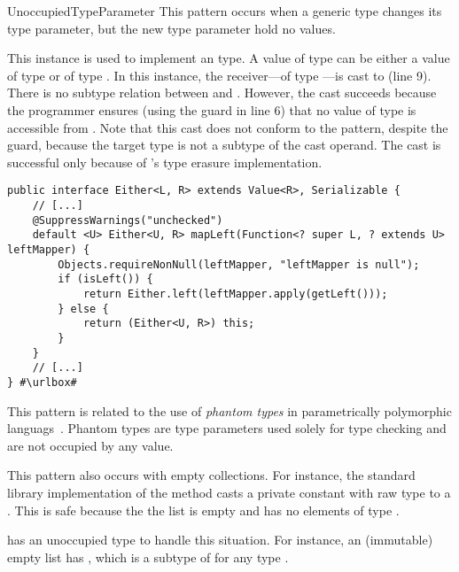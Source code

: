 \begin{pattern}{UnoccupiedTypeParameter}
This pattern occurs when a generic type changes its type parameter,
but the new type parameter hold no values.

\instances{}
This instance%
\def\urlvar{http://bit.ly/vavr_io_vavr_2SMIfI2}
is used to implement an  type.
A value of type  can be either a value of type  or of type .
In this instance, the receiver---of type ---is cast to  (line 9).
There is no subtype relation between  and .
However, the cast succeeds because the programmer ensures
(using the guard  in line 6)
that no value of type  is accessible from .
Note that this cast does not conform to the 
pattern, despite the guard, because the target type is not a subtype of the
cast operand.
The cast is successful only because of \java{}'s type erasure
implementation.

\begin{verbatim}
public interface Either<L, R> extends Value<R>, Serializable {
    // [...]
    @SuppressWarnings("unchecked")
    default <U> Either<U, R> mapLeft(Function<? super L, ? extends U> leftMapper) {
        Objects.requireNonNull(leftMapper, "leftMapper is null");
        if (isLeft()) {
            return Either.left(leftMapper.apply(getLeft()));
        } else {
            return (Either<U, R>) this;
        }
    }
    // [...]
} #\urlbox#
\end{verbatim}


\discussion{}
This pattern is related to the use of \emph{phantom types} in parametrically polymorphic languags~\cite{LeijenMeijer99,cheneyHinzePhantomTypes}.
Phantom types are type parameters used solely for type checking and are not occupied by any value.

This pattern also occurs with empty collections.
For instance, the \java{} standard library implementation of the method  casts a private constant with raw type  to a .
This is safe because the the list is empty and has no elements of type .

\scala{} has an unoccupied  type to handle this situation.
For instance, an (immutable) empty list has ,
which is a subtype of  for any type .

\end{pattern}